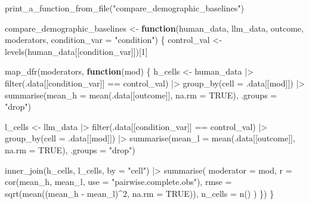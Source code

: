 \documentclass[
  letterpaper,
  DIV=11,
  numbers=noendperiod]{scrartcl}
\newenvironment{Shaded}{\begin{snugshade}}{\end{snugshade}}
\newcommand{\AttributeTok}[1]{\textcolor[rgb]{0.40,0.45,0.13}{#1}}
\newcommand{\ConstantTok}[1]{\textcolor[rgb]{0.56,0.35,0.01}{#1}}
\newcommand{\ControlFlowTok}[1]{\textcolor[rgb]{0.00,0.23,0.31}{\textbf{#1}}}
\newcommand{\DecValTok}[1]{\textcolor[rgb]{0.68,0.00,0.00}{#1}}
\newcommand{\FunctionTok}[1]{\textcolor[rgb]{0.28,0.35,0.67}{#1}}
\newcommand{\NormalTok}[1]{\textcolor[rgb]{0.00,0.23,0.31}{#1}}
\newcommand{\OtherTok}[1]{\textcolor[rgb]{0.00,0.23,0.31}{#1}}
\newcommand{\SpecialCharTok}[1]{\textcolor[rgb]{0.37,0.37,0.37}{#1}}
\newcommand{\StringTok}[1]{\textcolor[rgb]{0.13,0.47,0.30}{#1}}
\begin{document}
\begin{Shaded}
\begin{Highlighting}[]
\FunctionTok{print\_a\_function\_from\_file}\NormalTok{(}\StringTok{"compare\_demographic\_baselines"}\NormalTok{)}
\end{Highlighting}
\end{Shaded}

\begin{Shaded}
\begin{Highlighting}[]
\NormalTok{compare\_demographic\_baselines }\OtherTok{\textless{}{-}} \ControlFlowTok{function}\NormalTok{(human\_data, llm\_data,}
\NormalTok{                                           outcome,}
\NormalTok{                                           moderators,}
                                           \AttributeTok{condition\_var =} \StringTok{"condition"}\NormalTok{) \{}
\NormalTok{  control\_val }\OtherTok{\textless{}{-}} \FunctionTok{levels}\NormalTok{(human\_data[[condition\_var]])[}\DecValTok{1}\NormalTok{]}

  \FunctionTok{map\_dfr}\NormalTok{(moderators, }\ControlFlowTok{function}\NormalTok{(mod) \{}
\NormalTok{    h\_cells }\OtherTok{\textless{}{-}}\NormalTok{ human\_data }\SpecialCharTok{|\textgreater{}}
      \FunctionTok{filter}\NormalTok{(.data[[condition\_var]] }\SpecialCharTok{==}\NormalTok{ control\_val) }\SpecialCharTok{|\textgreater{}}
      \FunctionTok{group\_by}\NormalTok{(}\AttributeTok{cell =}\NormalTok{ .data[[mod]]) }\SpecialCharTok{|\textgreater{}}
      \FunctionTok{summarise}\NormalTok{(}\AttributeTok{mean\_h =} \FunctionTok{mean}\NormalTok{(.data[[outcome]], }\AttributeTok{na.rm =} \ConstantTok{TRUE}\NormalTok{), }\AttributeTok{.groups =} \StringTok{"drop"}\NormalTok{)}

\NormalTok{    l\_cells }\OtherTok{\textless{}{-}}\NormalTok{ llm\_data }\SpecialCharTok{|\textgreater{}}
      \FunctionTok{filter}\NormalTok{(.data[[condition\_var]] }\SpecialCharTok{==}\NormalTok{ control\_val) }\SpecialCharTok{|\textgreater{}}
      \FunctionTok{group\_by}\NormalTok{(}\AttributeTok{cell =}\NormalTok{ .data[[mod]]) }\SpecialCharTok{|\textgreater{}}
      \FunctionTok{summarise}\NormalTok{(}\AttributeTok{mean\_l =} \FunctionTok{mean}\NormalTok{(.data[[outcome]], }\AttributeTok{na.rm =} \ConstantTok{TRUE}\NormalTok{), }\AttributeTok{.groups =} \StringTok{"drop"}\NormalTok{)}

    \FunctionTok{inner\_join}\NormalTok{(h\_cells, l\_cells, }\AttributeTok{by =} \StringTok{"cell"}\NormalTok{) }\SpecialCharTok{|\textgreater{}}
      \FunctionTok{summarise}\NormalTok{(}
        \AttributeTok{moderator =}\NormalTok{ mod,}
        \AttributeTok{r         =} \FunctionTok{cor}\NormalTok{(mean\_h, mean\_l, }\AttributeTok{use =} \StringTok{"pairwise.complete.obs"}\NormalTok{),}
        \AttributeTok{rmse      =} \FunctionTok{sqrt}\NormalTok{(}\FunctionTok{mean}\NormalTok{((mean\_h }\SpecialCharTok{{-}}\NormalTok{ mean\_l)}\SpecialCharTok{\^{}}\DecValTok{2}\NormalTok{, }\AttributeTok{na.rm =} \ConstantTok{TRUE}\NormalTok{)),}
        \AttributeTok{n\_cells   =} \FunctionTok{n}\NormalTok{()}
\NormalTok{      )}
\NormalTok{  \})}
\NormalTok{\}}
\end{Highlighting}
\end{Shaded}
\end{document}

